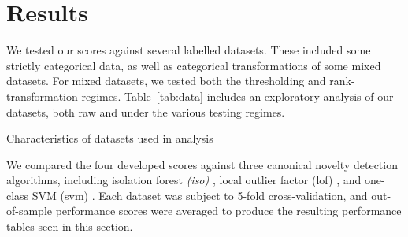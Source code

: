 
\section{Results}
We tested our scores against several labelled datasets.  These included some strictly
    categorical data, as well as categorical transformations of some mixed datasets.
    For mixed datasets, we tested both the thresholding and rank-transformation regimes. 
    Table~\ref{tab:data} includes an exploratory analysis of our datasets, both raw and
    under the various testing regimes.

\begin{table}[ht]
    \centering
    \caption{Characteristics of datasets used in analysis\label{tab:data}}
\end{table}

We compared the four developed scores against three canonical novelty detection algorithms,
    including isolation forest \emph{(iso)} \cite{liu2000}, local outlier factor (lof) \cite{breunig2000},
    and one-class SVM (svm) \cite{chang2011}.  Each dataset was subject to 5-fold 
    cross-validation, and out-of-sample performance scores were averaged to produce the
    resulting performance tables seen in this section.

